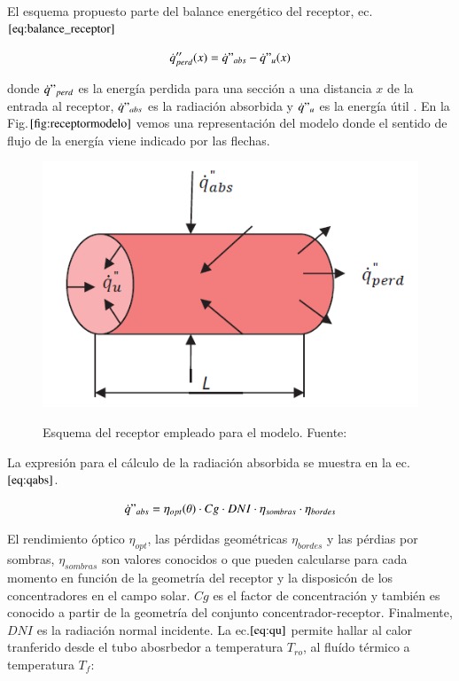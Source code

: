 El esquema propuesto parte del balance energético del receptor, ec.\(\eqref{eq:balance_receptor}\)

\begin{equation}
    \dot{q}''_{perd}(x) = \dot{q}"_{abs}-\dot{q}"_{u}(x) \label{eq:balance_receptor}
\end{equation}

donde \(\dot{q}"_{perd}\) es la energía perdida para una sección a una distancia \(x\) de la entrada al receptor, \(\dot{q}"_{abs}\) es la radiación absorbida y \(\dot{q}"_{u}\) es la energía útil . En la Fig.$\ref{fig:receptormodelo}$ vemos una representación del modelo donde el sentido de flujo de la energía viene indicado por las flechas.

\begin{figure}[H]
	\caption{Esquema del receptor empleado para el modelo. Fuente:\parencite{barberofresnoDesarrolloModeloTeorico2018}}
	\includegraphics[scale=0.8]{images/receptor_para_modelo.png}
	\label{fig:receptormodelo}
\end{figure}


La expresión para el cálculo de la radiación absorbida se muestra en la ec.\(\eqref{eq:qabs}\). 

\begin{equation}
    \dot{q}"_{abs}= \eta_{opt}(\theta) \cdot Cg \cdot DNI \cdot \eta_{sombras} \cdot \eta_{bordes} \label{eq:qabs}
\end{equation}

El rendimiento óptico \(\eta_{opt}\), las pérdidas geométricas \(\eta_{bordes}\) y las pérdias por sombras, \(\eta_{sombras}\) son valores conocidos o que pueden calcularse para cada momento en función de la geometría del receptor y la disposicón de los concentradores en el campo solar. \(Cg\) es el factor de concentración y también es conocido a partir de la geometría del conjunto concentrador-receptor. Finalmente, \(DNI\) es la radiación normal incidente. La ec.\(\eqref{eq:qu}\) permite hallar al calor tranferido desde el tubo abosrbedor a temperatura \(T_{ro}\), al fluído térmico a temperatura \(T_{f}\):

